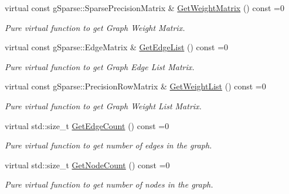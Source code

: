 \begin{DoxyCompactItemize}
\mbox{\label{classg_sparse_1_1_i_graph_aef60a9eb32de1ceb2a62313a54609ac4}} 
virtual const g\+Sparse\+::\+Sparse\+Precision\+Matrix \& \mbox{\hyperlink{classg_sparse_1_1_i_graph_aef60a9eb32de1ceb2a62313a54609ac4}{Get\+Weight\+Matrix}} () const =0
\begin{DoxyCompactList}\small\item\em Pure virtual function to get Graph Weight Matrix. \end{DoxyCompactList}\item 
\mbox{\label{classg_sparse_1_1_i_graph_ad7bc73bd80951ccb15f391c02a1def23}} 
virtual const g\+Sparse\+::\+Edge\+Matrix \& \mbox{\hyperlink{classg_sparse_1_1_i_graph_ad7bc73bd80951ccb15f391c02a1def23}{Get\+Edge\+List}} () const =0
\begin{DoxyCompactList}\small\item\em Pure virtual function to get Graph Edge List Matrix. \end{DoxyCompactList}\item 
\mbox{\label{classg_sparse_1_1_i_graph_a4230acbf3a86759fe6a5e19c3293adc7}} 
virtual const g\+Sparse\+::\+Precision\+Row\+Matrix \& \mbox{\hyperlink{classg_sparse_1_1_i_graph_a4230acbf3a86759fe6a5e19c3293adc7}{Get\+Weight\+List}} () const =0
\begin{DoxyCompactList}\small\item\em Pure virtual function to get Graph Weight List Matrix. \end{DoxyCompactList}\item 
\mbox{\label{classg_sparse_1_1_i_graph_a0dc8f4d2283a175876cf8e56a7979e78}} 
virtual std\+::size\+\_\+t \mbox{\hyperlink{classg_sparse_1_1_i_graph_a0dc8f4d2283a175876cf8e56a7979e78}{Get\+Edge\+Count}} () const =0
\begin{DoxyCompactList}\small\item\em Pure virtual function to get number of edges in the graph. \end{DoxyCompactList}\item 
\mbox{\label{classg_sparse_1_1_i_graph_a810e7c5a7e011f516b4a8ae56fe8ce3b}} 
virtual std\+::size\+\_\+t \mbox{\hyperlink{classg_sparse_1_1_i_graph_a810e7c5a7e011f516b4a8ae56fe8ce3b}{Get\+Node\+Count}} () const =0
\begin{DoxyCompactList}\small\item\em Pure virtual function to get number of nodes in the graph. \end{DoxyCompactList}\end{DoxyCompactItemize}
